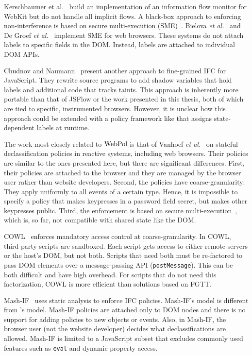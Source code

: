 Kerschbaumer et al.~\cite{crowdflow} build an implementation of an
information flow monitor for WebKit but do not handle all implicit
flows.  A black-box approach to enforcing non-interference is based on
secure multi-execution (SME)~\cite{SME}. Bielova \emph{et
  al.}~\cite{rnib} and De Groef \emph{et al.}~\cite{flowfox} implement
SME for web browsers. These systems do not attach labels to specific
fields in the DOM. Instead, labels are attached to individual DOM
APIs.

Chudnov and Naumann~\cite{chudnov-ccs} present another approach to
fine-grained IFC for JavaScript. They rewrite source programs to add
shadow variables that hold labels and additional code that tracks
taints. This approach is inherently more portable than that of JSFlow
or the work presented in this thesis, both of which are tied to
specific, instrumented browsers. However, it is unclear how this
approach could be extended with a policy framework like {\sys} that
assigns state-dependent labels at runtime.

The work most closely related to $\mbox{WebPol}$ is that of
Vanhoef \emph{et al.}~\cite{csf14} on stateful declassification
policies in reactive systems, including web browsers. Their policies
are similar to the ones presented here, but there are significant
differences. First, 
their policies are attached to the browser and they are managed by the
browser user rather than website developers. Second, the policies have 
coarse-granularity: They apply uniformly to all events of a certain
type. Hence, it is impossible to specify a policy that makes
keypresses in a password field secret, but makes other keypresses
public. Third, the enforcement is based on secure
multi-execution~\cite{SME}, which is, so far, not compatible with
shared state like the DOM.

COWL~\cite{cowl} enforces mandatory access control at
coarse-granularity. In COWL, third-party scripts are sandboxed. Each
script gets access to either remote servers or the host's DOM, but not
both. Scripts that need both must be re-factored to pass DOM elements
over a message-passing API (\texttt{postMessage}). This can be both
difficult and have high overhead. For scripts that do not need this
factorization, COWL is more efficient than solutions based on FGTT.

Mash-IF~\cite{mashif} uses static analysis to enforce IFC
policies. Mash-IF's model is different from {\sys}'s model. Mash-IF
policies are attached only to DOM nodes and there is no support for
adding policies to new objects or events. Also, in Mash-IF, the
browser user (not the website developer) decides what
declassifications are allowed. Mash-IF is limited to a JavaScript
subset that excludes commonly used features such as \texttt{eval} and
dynamic property access.

